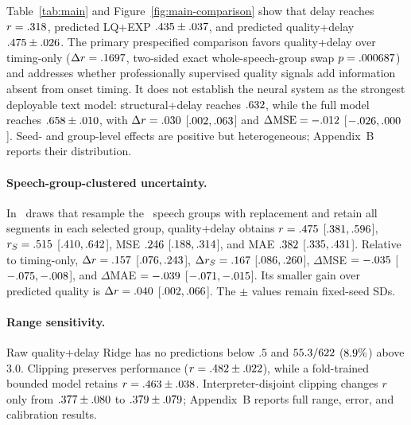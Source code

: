 Table~\ref{tab:main} and Figure~\ref{fig:main-comparison} show that delay reaches $r=.318$, predicted LQ+EXP $.435\pm.037$, and predicted quality+delay $.475\pm.026$. The primary prespecified comparison favors quality+delay over timing-only ($\Delta r=.1697$, two-sided exact whole-speech-group swap $p=.000687$) and addresses whether professionally supervised quality signals add information absent from onset timing. It does not establish the neural system as the strongest deployable text model: structural+delay reaches $.632$, while the full model reaches $.658\pm.010$, with $\Delta r=.030$ [$.002,.063$] and $\Delta\mathrm{MSE}=-.012$ [$-.026,.000$]. Seed- and group-level effects are positive but heterogeneous; Appendix~B reports their distribution.

\paragraph{Speech-group-clustered uncertainty.} In \BootstrapDraws\ draws that resample the \SpeechGroupN\ speech groups with replacement and retain all segments in each selected group, quality+delay obtains $r=.475$ [$.381,.596$], $r_S=.515$ [$.410,.642$], MSE $.246$ [$.188,.314$], and MAE $.382$ [$.335,.431$]. Relative to timing-only, $\Delta r=.157$ [$.076,.243$], $\Delta r_S=.167$ [$.086,.260$], $\Delta$MSE $=-.035$ [$-.075,-.008$], and $\Delta$MAE $=-.039$ [$-.071,-.015$]. Its smaller gain over predicted quality is $\Delta r=.040$ [$.002,.066$]. The $\pm$ values remain fixed-seed SDs.

\paragraph{Range sensitivity.} Raw quality+delay Ridge has no predictions below .5 and $55.3/622$ ($8.9\%$) above 3.0. Clipping preserves performance ($r=.482\pm.022$), while a fold-trained bounded model retains $r=.463\pm.038$. Interpreter-disjoint clipping changes $r$ only from $.377\pm.080$ to $.379\pm.079$; Appendix~B reports full range, error, and calibration results.

